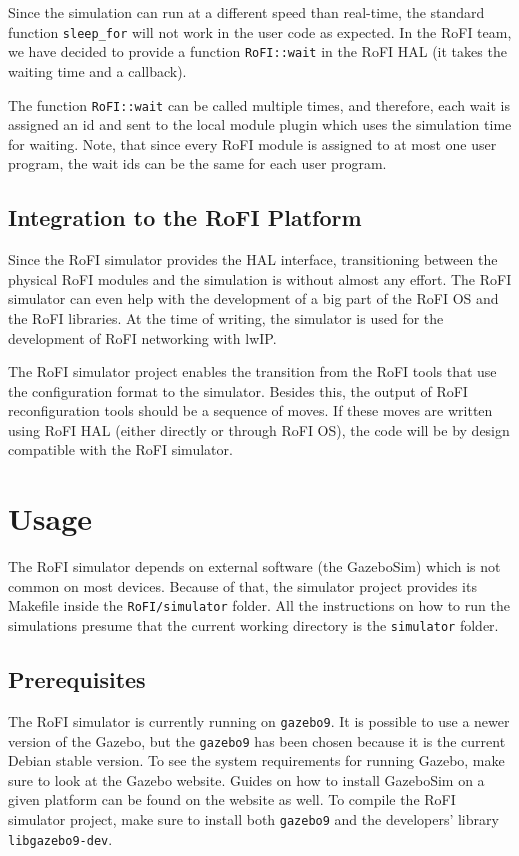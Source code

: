 \documentclass[
  printed, %
  color,   %
  notable, %
  oneside, %
  nolof,   %
  nolot,   %
  nocover,
]{fithesis3}
\newcommand{\code}[1]{\texttt{#1}}
\begin{document}
Since the simulation can run at a different speed than real-time, the standard function \code{sleep\_for} will not work in the user code as expected.
In the RoFI team, we have decided to provide a function \code{RoFI::wait} in the RoFI HAL (it takes the waiting time and a callback).

The function \code{RoFI::wait} can be called multiple times, and therefore, each wait is assigned an id and sent to the local module plugin which uses the simulation time for waiting.
Note, that since every RoFI module is assigned to at most one user program, the wait ids can be the same for each user program.

\section{Integration to the RoFI Platform}

Since the RoFI simulator provides the HAL interface, transitioning between the physical RoFI modules and the simulation is without almost any effort.
The RoFI simulator can even help with the development of a big part of the RoFI OS and the RoFI libraries.
At the time of writing, the simulator is used for the development of RoFI networking with lwIP.

The RoFI simulator project enables the transition from the RoFI tools that use the configuration format to the simulator.
Besides this, the output of RoFI reconfiguration tools should be a sequence of moves.
If these moves are written using RoFI HAL (either directly or through RoFI OS), the code will be by design compatible with the RoFI simulator.


\chapter{Usage}

The RoFI simulator depends on external software (the GazeboSim) which is not common on most devices.
Because of that, the simulator project provides its Makefile inside the \code{RoFI/simulator} folder.
All the instructions on how to run the simulations presume that the current working directory is the \code{simulator} folder.

\section{Prerequisites}
The RoFI simulator is currently running on \code{gazebo9}.
It is possible to use a newer version of the Gazebo, but the \code{gazebo9} has been chosen because it is the current Debian stable version.
To see the system requirements for running Gazebo, make sure to look at the Gazebo website\cite{gazebo-web}.
Guides on how to install GazeboSim on a given platform can be found on the website\cite{gazebo-web} as well.
To compile the RoFI simulator project, make sure to install both \code{gazebo9} and the developers' library \code{libgazebo9-dev}.
\end{document}
